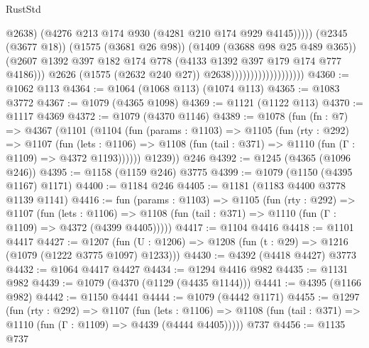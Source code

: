 \begin{lexlean}{RustStd}
\begin{coremodule}
                                                    @2638)
                                                  (@4276
                                                    @213
                                                    @174
                                                    @930
                                                    (@4281 @210 @174 @929 @4145)))))
                                            (@2345 (@3677 @18))
                                            (@1575 (@3681 @26 @98))
                                            (@1409 (@3688 @98 @25 @489 @365))
                                            (@2607
                                              @1392
                                              @397
                                              @182
                                              @174
                                              @778
                                              (@4133 @1392 @397 @179 @174 @777 @4186)))
                                          @2626
                                          (@1575 (@2632 @240 @27))
                                          @2638)))))))))))))))))))
@4360 := @1062 @113
@4364 := @1064 (@1068 @113) (@1074 @113)
@4365 := @1083 @3772
@4367 := @1079 (@4365 @1098)
@4369 := @1121 (@1122 @113)
@4370 := @1117 @4369
@4372 := @1079 (@4370 @1146)
@4389 := @1078
    (fun (fn : @7) =>
    @4367
      (@1101
        (@1104
          (fun (params : @1103) =>
          @1105
            (fun (rty : @292) =>
            @1107
              (fun (lets : @1106) =>
              @1108 (fun (tail : @371) => @1110 (fun (Γ : @1109) => @4372 @1193))))))
        @1239))
    @246
@4392 := @1245 (@4365 (@1096 @246))
@4395 := @1158 (@1159 @246) @3775
@4399 := @1079 (@1150 (@4395 @1167) @1171)
@4400 := @1184 @246
@4405 := @1181 (@1183 @4400 @3778 @1139 @1141)
@4416 := fun (params : @1103) =>
  @1105
    (fun (rty : @292) =>
    @1107
      (fun (lets : @1106) =>
      @1108 (fun (tail : @371) => @1110 (fun (Γ : @1109) => @4372 (@4399 @4405)))))
@4417 := @1104 @4416
@4418 := @1101 @4417
@4427 := @1207 (fun (U : @1206) => @1208 (fun (t : @29) => @1216 (@1079 (@1222 @3775 @1097) @1233)))
@4430 := @4392 (@4418 @4427) @3773
@4432 := @1064 @4417 @4427
@4434 := @1294 @4416 @982
@4435 := @1131 @982
@4439 := @1079 (@4370 (@1129 (@4435 @1144)))
@4441 := @4395 (@1166 @982)
@4442 := @1150 @4441
@4444 := @1079 (@4442 @1171)
@4455 := @1297
    (fun (rty : @292) =>
    @1107
      (fun (lets : @1106) =>
      @1108 (fun (tail : @371) => @1110 (fun (Γ : @1109) => @4439 (@4444 @4405)))))
    @737
@4456 := @1135 @737

\end{coremodule}
\end{lexlean}
